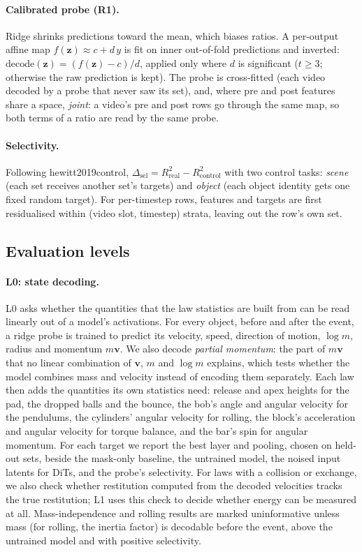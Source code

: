 \documentclass[10pt]{article}
\providecommand{\citet}[1]{\textsf{#1}}
\begin{document}
\paragraph{Calibrated probe (R1).} Ridge shrinks predictions toward the mean, which biases ratios. A per-output affine
map $f(\mathbf z)\approx c+d\,y$ is fit on inner out-of-fold predictions and inverted: $\mathrm{decode}(\mathbf z)=(f(\mathbf z)-c)/d$,
applied only where $d$ is significant ($t\ge3$; otherwise the raw prediction is kept). The probe is
cross-fitted (each video decoded by a probe that never saw its set), and, where pre and post features share a space,
\emph{joint}: a video's pre and post rows go through the same map, so both terms of a ratio are read by the same probe.

\paragraph{Selectivity.} Following \citet{hewitt2019control}, $\Delta_{\mathrm{sel}}=R^2_{\mathrm{real}}-
R^2_{\mathrm{control}}$ with two control tasks: \emph{scene} (each set receives another set's targets) and
\emph{object} (each object identity gets one fixed random target). For per-timestep rows, features and targets are
first residualised within (video slot, timestep) strata, leaving out the row's own set.

\subsection{Evaluation levels}

\paragraph{L0: state decoding.}
L0 asks whether the quantities that the law statistics are built from can be read linearly out of a model's
activations. For every object, before and after the event, a ridge probe is trained to predict its velocity, speed,
direction of motion, $\log m$, radius and momentum $m\mathbf v$. We also decode \emph{partial momentum}: the part of
$m\mathbf v$ that no linear combination of $\mathbf v$, $m$ and $\log m$ explains, which tests whether the model
combines mass and velocity instead of encoding them separately. Each law then adds the quantities its own statistics
need: release and apex heights for the pad, the dropped balls and the bounce, the bob's angle and angular velocity for the
pendulums, the cylinders' angular velocity for rolling, the block's acceleration and angular velocity for torque
balance, and the bar's spin for angular momentum. For each target we report the best layer and pooling, chosen on
held-out sets, beside the mask-only baseline, the untrained model, the noised input latents for DiTs, and the probe's
selectivity. For laws with a collision or exchange, we also check whether restitution computed from the decoded
velocities tracks the true restitution; L1 uses this check to decide whether energy can be measured at all.
Mass-independence and rolling results are marked uninformative unless mass (for rolling, the inertia factor) is
decodable before the event, above the untrained model and with positive selectivity.
\end{document}
